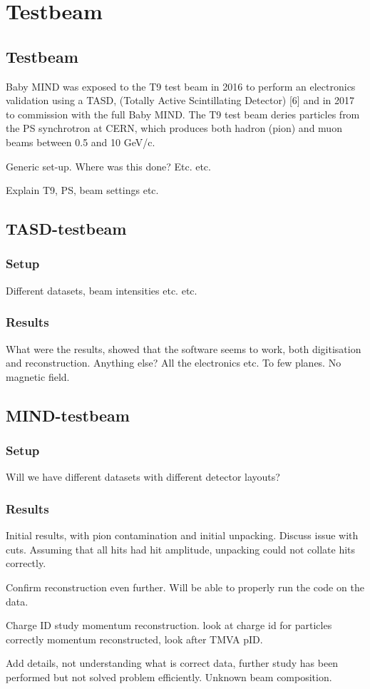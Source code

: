 \chapter{Testbeam}
\label{c:Testbeam}

\section{Testbeam}


Baby MIND was exposed to the T9 test beam in 2016 to perform an electronics validation using a TASD, (Totally Active Scintillating Detector) [6] and in 2017 to commission with the full Baby MIND. The T9 test beam deries particles from the PS synchrotron at CERN, which produces both hadron (pion) and muon beams between 0.5 and 10 GeV/c.

Generic set-up. Where was this done? Etc. etc.

Explain T9, PS, beam settings etc.

\section{TASD-testbeam}
\subsection{Setup}
Different datasets, beam intensities etc. etc.
\subsection{Results}
What were the results, showed that the software seems to work, both digitisation and reconstruction. Anything else? All the electronics etc. To few planes. No magnetic field.

\section{MIND-testbeam}
\subsection{Setup}
Will we have different datasets with different detector layouts? 
\subsection{Results}

Initial results, with pion contamination and initial unpacking. Discuss issue with cuts. Assuming that all hits had hit amplitude, unpacking could not collate hits correctly.

Confirm reconstruction even further. Will be able to properly run the code on the data.

Charge ID study momentum reconstruction. look at charge id for particles correctly momentum reconstructed, look after TMVA pID. 


Add details, not understanding what is correct data, further study has been performed but not solved problem efficiently. Unknown beam composition.


